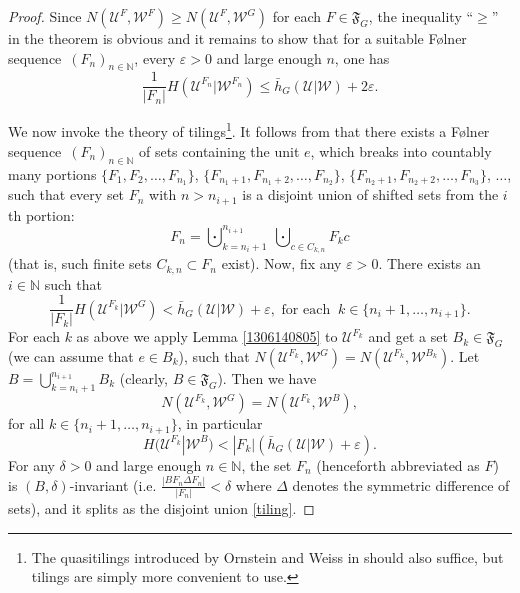 \documentclass[12pt]{amsart}
\theoremstyle{definition}
\numberwithin{equation}{section}
\newcommand{\CU}{\mathcal{U}}
\newcommand{\CW}{\mathcal{W}}
\def \N {\mathbb N}
\def \sq {sequence}
\def \eps {\varepsilon}
\def \N {\mathbb N}
\def \CU {\mathcal U}
\def \sq {sequence}
\begin{document}
\begin{proof}
Since $N(\CU^F,\CW^F)\ge N(\CU^F,\CW^G)$ for each $F\in \mathfrak{F}_G$, the inequality ``$\ge$'' in the theorem is obvious and it remains to show that for a suitable F\o lner \sq\
$(F_n)_{n\in\N}$, every $\eps>0$ and large enough $n$, one has
\begin{equation} \label{1307082008}
\frac{1}{|F_n|}H(\CU^{F_n}|\CW^{F_n})\le\bar h_G(\CU|\CW)+2\eps.
\end{equation}

We now invoke the theory of tilings\footnote{The quasitilings introduced by Ornstein and Weiss in \cite{OW} should also suffice, but tilings are simply more convenient to use.}. It follows from \cite[Theorem 5.2]{DHZ} that there exists a F\o lner \sq\ $(F_n)_{n\in\N}$ of sets containing the unit $e$, which breaks into countably many portions $\{F_1,F_2,\dots,F_{n_1}\}$, $\{F_{n_1+1},F_{n_1+2},\dots,F_{n_2}\}$, $\{F_{n_2+1},F_{n_2+2},\dots,F_{n_3}\}$, $\dots$, such that every set $F_n$ with $n>n_{i+1}$ is a disjoint union of shifted sets from the $i$th portion:
\begin{equation} \label{tiling}
F_n=\bigcupdot_{k=n_i+1}^{n_{i+1}}\ \bigcupdot_{c\in C_{k,n}}F_kc
\end{equation}
(that is, such finite sets $C_{k,n}\subset F_n$ exist). Now, fix any $\eps>0$. There exists an $i\in \mathbb{N}$ such that
$$
\frac{1}{|F_k|} H(\CU^{F_k}|\CW^G)< \bar h_G(\CU|\CW)+\eps, \text{ \ for each\ }\ k\in \{n_i+1,\dots,n_{i+1}\}.
$$
For each $k$ as above we apply Lemma \ref{1306140805} to $\CU^{F_k}$ and get a set $B_k\in \mathfrak{F}_G$ (we can assume that $e\in B_k$), such that $N(\CU^{F_k},\CW^G)=N(\CU^{F_k},\CW^{B_k})$. 
Let $B=\bigcup_{k=n_i+1}^{n_{i+1}}B_k$ (clearly, $B\in \mathfrak{F}_G$). Then we have
$$
N(\CU^{F_k},\CW^G)= N(\CU^{F_k},\CW^B),
$$
for all $k\in \{n_i+1,\dots,n_{i+1}\}$, in particular
\begin{equation}\label{tera}
H(\CU^{F_k}|\CW^B)<|F_k|(\bar h_G(\CU|\CW)+\eps).
\end{equation}
For any $\delta>0$ and large enough $n\in\N$, the set $F_n$ (henceforth abbreviated as $F$) is $(B,\delta)$-invariant (i.e. $\frac{|B F_n\Delta F_n|}{|F_n|}< \delta$ where $\Delta$ denotes the symmetric difference of sets), and it splits as the disjoint union \eqref{tiling}.


\end{proof}
\end{document}
